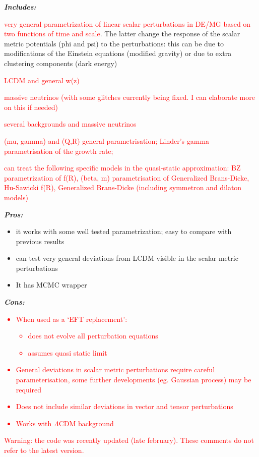 {\it \bf Includes: }
\begin{itemize}
 \item \textcolor{red}{very general parametrization of linear scalar perturbations in DE/MG based on two functions of time and scale}. The latter change the response of the scalar metric potentials (phi and psi) to the perturbations: this can be due to modifications of the Einstein equations 
 (modified gravity) or due to extra clustering components (dark energy)
\textcolor{red}{
\item LCDM and general w(z)
\item massive neutrinos (with some glitches currently being fixed. I can elaborate more on this if needed)
\item several backgrounds and massive neutrinos
\item (mu, gamma) and (Q,R) general parametrisation; Linder’s gamma parametrisation of the growth rate; 
\item can treat the following specific models in the quasi-static approximation: BZ parametrization of f(R), (beta, m) parametrisation of Generalized Brans-Dicke, Hu-Sawicki f(R), Generalized Brans-Dicke (including symmetron and dilaton models)
}
\end{itemize}

{\it \bf Pros: }
\begin{itemize}
 \item it works with some well tested parametrization; easy to compare with previous results 
 \item can test  very general deviations from LCDM visible in the scalar metric perturbations
 \item  It has MCMC wrapper
\end{itemize}

{\it \bf Cons: }
\textcolor{red}{
\begin{itemize}
 \item When used as a ‘EFT replacement’:
 \begin{itemize}
  \item does not evolve all perturbation equations 
  \item assumes quasi static limit
 \end{itemize}
 \item General deviations in scalar metric perturbations require careful parameterisation, some further developments (eg. Gaussian process) may be required
 \item Does not include similar deviations in vector and tensor perturbations
 \item Works with $\Lambda$CDM background
\end{itemize}
Warning: the code was recently updated (late february). These comments do not refer to the latest version.\\
}
\newpage
